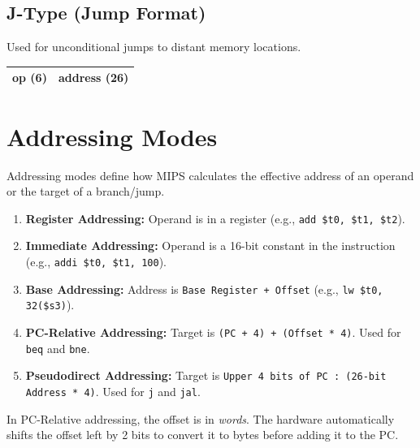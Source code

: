 \subsection{J-Type (Jump Format)}
Used for unconditional jumps to distant memory locations.
\begin{table}[h]
\centering
\vspace{5pt}
\begin{tabular}{|c|c|}
\hline
\textbf{op} (6) & \textbf{address} (26) \\
\hline
\end{tabular}
\vspace{5pt}
\end{table}

\section{Addressing Modes}

Addressing modes define how MIPS calculates the effective address of an operand or the target of a branch/jump.

\begin{enumerate}
    \item \textbf{Register Addressing:} Operand is in a register (e.g., \texttt{add \$t0, \$t1, \$t2}).
    \item \textbf{Immediate Addressing:} Operand is a 16-bit constant in the instruction (e.g., \texttt{addi \$t0, \$t1, 100}).
    \item \textbf{Base Addressing:} Address is \texttt{Base Register + Offset} (e.g., \texttt{lw \$t0, 32(\$s3)}).
    \item \textbf{PC-Relative Addressing:} Target is \texttt{(PC + 4) + (Offset * 4)}. Used for \texttt{beq} and \texttt{bne}.
    \item \textbf{Pseudodirect Addressing:} Target is \texttt{Upper 4 bits of PC : (26-bit Address * 4)}. Used for \texttt{j} and \texttt{jal}.
\end{enumerate}

\begin{remark}

In PC-Relative addressing, the offset is in \textit{words}. The hardware automatically shifts the offset left by 2 bits to convert it to bytes before adding it to the PC.
\end{remark}
